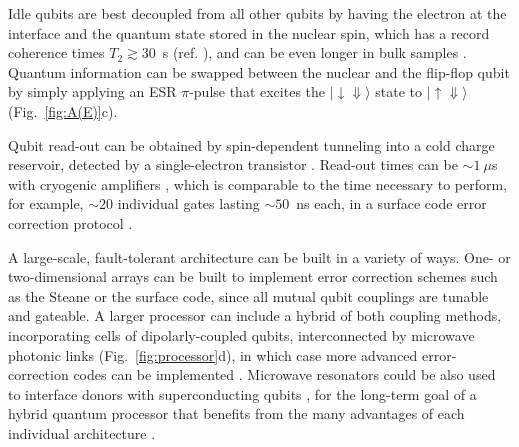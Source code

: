Idle qubits are best decoupled from all other qubits by having the electron at the interface and the quantum state stored in the nuclear spin, which has a record coherence times $T_2 \gtrsim 30$~s (ref. \cite{Muhonen2014}), and can be even longer in bulk samples \cite{Saeedi2013}. Quantum information can be swapped between the nuclear and the flip-flop qubit by simply applying an ESR $\pi$-pulse that excites the $\lvert{\downarrow\Downarrow}\rangle$ state to $\lvert{\uparrow\Downarrow}\rangle$ (Fig.~\ref{fig:A(E)}c).

Qubit read-out can be obtained by spin-dependent tunneling into a cold charge reservoir, detected by a single-electron transistor \cite{Morello2010}. Read-out times can be $\sim1~\mu$s with cryogenic amplifiers \cite{Curry2015}, which is comparable to the time necessary to perform, for example, $\sim 20$ individual gates lasting $\sim 50$~ns each, in a surface code error correction protocol \cite{Fowler2012}.

A large-scale, fault-tolerant architecture can be built in a variety of ways. One- or two-dimensional arrays can be built to implement error correction schemes such as the Steane \cite{Steane1996} or the surface \cite{Fowler2012} code, since all mutual qubit couplings are tunable and gateable. A larger processor can include a hybrid of both coupling methods, incorporating cells of dipolarly-coupled qubits, interconnected by microwave photonic links (Fig.~\ref{fig:processor}d), in which case more advanced error-correction codes can be implemented \cite{Knill2005,Nickerson2013,Terhal2015,Li2017}. Microwave resonators could be also used to interface donors with superconducting qubits \cite{Barends2014,Devoret2013}, for the long-term goal of a hybrid quantum processor that benefits from the many advantages of each individual architecture \cite{Xiang2013}.
